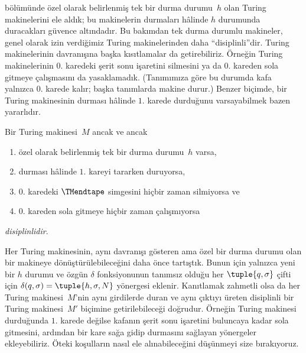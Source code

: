 \documentclass[../../../include/open-logic-section]{subfiles}
\begin{document}

\begin{explain}
 bölümünde özel olarak belirlenmiş tek bir durma durumu~$h$
olan Turing makinelerini ele aldık; bu makinelerin durmaları hâlinde $h$
durumunda duracakları güvence altındadır. Bu bakımdan tek durma durumlu
makineler, genel olarak izin verdiğimiz Turing makinelerinden daha
``disiplinli''dir. Turing makinelerinin davranışına başka kısıtlamalar da
getirebiliriz. Örneğin Turing makinelerinin $0$. karedeki şerit sonu
işaretini silmesini ya da $0$. kareden sola gitmeye çalışmasını da
yasaklamadık. (Tanımımıza göre bu durumda kafa yalnızca $0$. karede kalır;
başka tanımlarda makine durur.) Benzer biçimde, bir Turing makinesinin
durması hâlinde $1$. karede durduğunu varsayabilmek bazen yararlıdır.
\end{explain}

\begin{defn}
Bir Turing makinesi~$M$ ancak ve ancak
\begin{enumerate}
    \item özel olarak belirlenmiş tek bir durma durumu~$h$ varsa,
    \item durması hâlinde $1$. kareyi tararken duruyorsa,
    \item $0$. karedeki $\TMendtape$ simgesini hiçbir zaman silmiyorsa ve
    \item $0$. kareden sola gitmeye hiçbir zaman çalışmıyorsa
\end{enumerate}
\emph{disiplinlidir}.
\end{defn}

\begin{explain}
Her Turing makinesinin, aynı davranışı gösteren ama özel bir durma durumu olan
bir makineye dönüştürülebileceğini daha önce tartıştık. Bunun için yalnızca
yeni bir $h$ durumu ve özgün $\delta$ fonksiyonunun tanımsız olduğu her
$\tuple{q,\sigma}$ çifti için
$\delta(q,\sigma)=\tuple{h,\sigma,N}$ yönergesi eklenir. Kanıtlamak zahmetli
olsa da her Turing makinesi~$M$'nin aynı girdilerde duran ve aynı çıktıyı
üreten disiplinli bir Turing makinesi~$M'$ biçimine getirilebileceği
doğrudur. Örneğin Turing makinesi durduğunda $1$. karede değilse kafanın şerit
sonu işaretini buluncaya kadar sola gitmesini, ardından bir kare sağa gidip
durmasını sağlayan yönergeler ekleyebiliriz. Öteki koşulların nasıl ele
alınabileceğini düşünmeyi size bırakıyoruz.
\end{explain}
\end{document}

